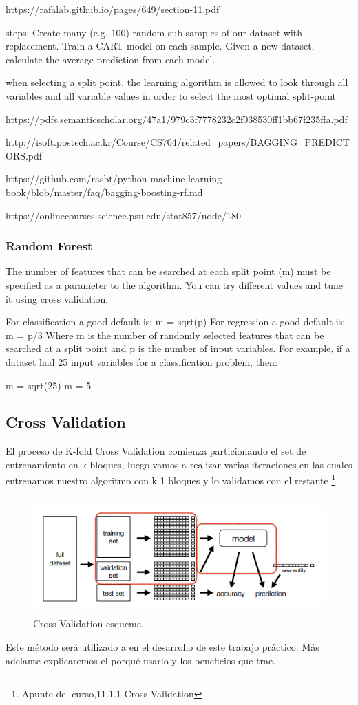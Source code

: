 https://rafalab.github.io/pages/649/section-11.pdf

steps:
Create many (e.g. 100) random sub-samples of our dataset with replacement.
Train a CART model on each sample.
Given a new dataset, calculate the average prediction from each model.

when selecting a split point, the learning algorithm is allowed to look through all variables and all variable values in order to select the most optimal split-point

https://pdfs.semanticscholar.org/47a1/979c3f7778232c2f038530ff1bb67f235ffa.pdf

http://isoft.postech.ac.kr/Course/CS704/related_papers/BAGGING_PREDICTORS.pdf

https://github.com/rasbt/python-machine-learning-book/blob/master/faq/bagging-boosting-rf.md

https://onlinecourses.science.psu.edu/stat857/node/180


\subsubsection{Random Forest}

The number of features that can be searched at each split point (m) must be specified as a parameter to the algorithm. You can try different values and tune it using cross validation.

For classification a good default is: m = sqrt(p)
For regression a good default is: m = p/3
Where m is the number of randomly selected features that can be searched at a split point and p is the number of input variables. For example, if a dataset had 25 input variables for a classification problem, then:

m = sqrt(25)
m = 5


\subsection{Cross Validation}

El proceso de K-fold Cross Validation comienza particionando el set de entrenamiento en k bloques, luego vamos a realizar varias iteraciones en las cuales entrenamos nuestro algoritmo con k 1 bloques y lo validamos con el restante \footnote{Apunte del curso,11.1.1
Cross Validation}.

\begin{figure}[h]
\centering
\includegraphics[height=4.5cm]{imagenes/crossValidation}
\caption{Cross Validation esquema}
\label{fig:exemplo}
\end{figure}

Este método será utilizado a en el desarrollo de este trabajo práctico. Más adelante explicaremos el porqué usarlo y los beneficios que trae.


